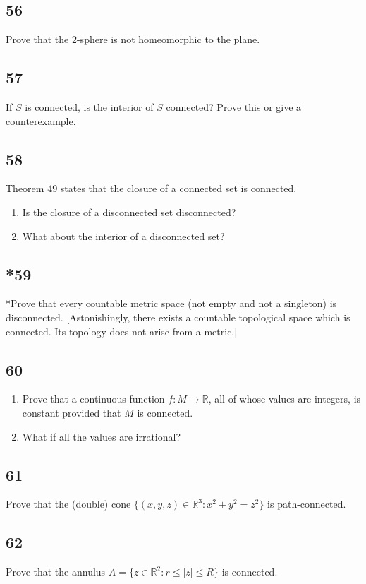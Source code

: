 \documentclass{amsart}
\begin{document}
\subsection*{56}
Prove that the 2-sphere is not homeomorphic to the plane.

\subsection*{57}
If $S$ is connected, is the interior of $S$ connected? Prove this or give a counterexample.

\subsection*{58}
Theorem 49 states that the closure of a connected set is connected.
\begin{enumerate}[label=(\alph*)]
\item Is the closure of a disconnected set disconnected?
\item What about the interior of a disconnected set?
\end{enumerate}

\subsection*{*59}
*Prove that every countable metric space (not empty and not a singleton) is disconnected. [Astonishingly, there exists a countable topological space which is connected. Its topology does not arise from a metric.]

\subsection*{60}
\begin{enumerate}[label=(\alph*)]
\item Prove that a continuous function $f : M \to \mathbb{R}$, all of whose values are integers, is constant provided that $M$ is connected.
\item What if all the values are irrational?
\end{enumerate}

\subsection*{61}
Prove that the (double) cone $\{(x,y,z) \in \mathbb{R}^3 : x^2+y^2 = z^2\}$ is path-connected.

\subsection*{62}
Prove that the annulus $A = \{z \in \mathbb{R}^2 : r \le |z| \le R\}$ is connected.
\end{document}
